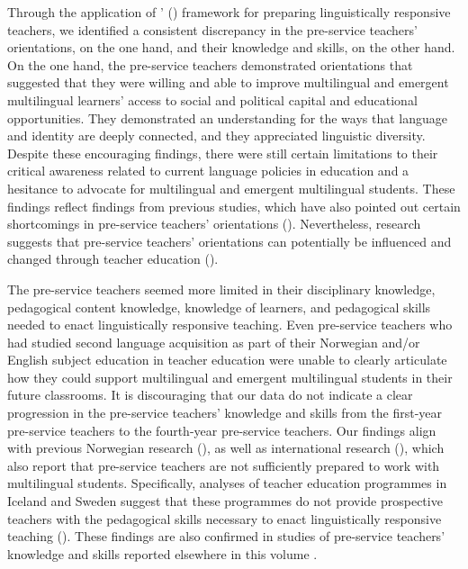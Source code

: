 \documentclass[output=paper]{langscibook}
\begin{document}
Through the application of \citeauthor{LucasVillegas2013}' (\citeyear{LucasVillegas2013}) framework for preparing linguistically responsive teachers, we identified a consistent discrepancy in the pre-service teachers’ orientations, on the one hand, and their knowledge and skills, on the other hand. On the one hand, the pre-service teachers demonstrated orientations that suggested that they were willing and able to improve multilingual and emergent multilingual learners’ access to social and political capital and educational opportunities. They demonstrated an understanding for the ways that language and identity are deeply connected, and they appreciated linguistic diversity. Despite these encouraging findings, there were still certain limitations to their critical awareness related to current language policies in education and a hesitance to advocate for multilingual and emergent multilingual students. These findings reflect findings from previous studies, which have also pointed out certain shortcomings in pre-service teachers’ orientations (\citealt{AndersonStillman2013,PaulsrudEtAl2023,VillegasEtAl2018}). Nevertheless, research suggests that pre-service teachers’ orientations can potentially be influenced and changed through teacher education (\citealt{Aleksic2023,Doll2023,AndersonStillman2013,SchroedlerEtAl2023,VillegasEtAl2018}).

The pre-service teachers seemed more limited in their disciplinary knowledge, pedagogical content knowledge, knowledge of learners, and pedagogical skills needed to enact linguistically responsive teaching. Even pre-service teachers who had studied second language acquisition as part of their Norwegian and/or English subject education in teacher education were unable to clearly articulate how they could support multilingual and emergent multilingual students in their future classrooms. It is discouraging that our data do not indicate a clear progression in the pre-service teachers’ knowledge and skills from the first-year pre-service teachers to the fourth-year pre-service teachers. Our findings align with previous Norwegian research (\citealt{DyrnesEtAl2015,RandenEtAl2015,Skrefsrud2015-1,The_evaluation_group2015}), as well as international research (\citealt{AcquahEtAl2020,AcquahSzelei2020,AndersonStillman2013,BravoEtAl2014,GroulxSilva2010,SchroedlerEtAl2023,TandonEtAl2017,VillegasEtAl2018}), which also report that pre-service teachers are not sufficiently prepared to work with multilingual students. Specifically, analyses of teacher education programmes in Iceland and Sweden suggest that these programmes do not provide prospective teachers with the pedagogical skills necessary to enact linguistically responsive teaching (\citealt{chapters/2_Gunnthorsdottira}). These findings are also confirmed in studies of pre-service teachers’ knowledge and skills reported elsewhere in this volume \parencite{chapters/7_alisaari, chapters/8_heikkola, chapters/5_ostergaard}.
\end{document}
